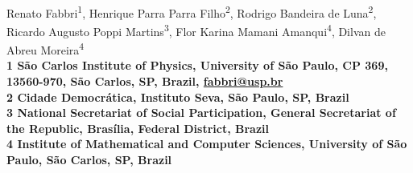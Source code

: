 \documentclass[10pt,letterpaper]{article}
\date{}
\begin{document}
\vspace*{0.35in}

\begin{flushleft}
{\Large
\textbf{}
}
\newline
\\
Renato Fabbri\textsuperscript{1},
Henrique Parra Parra Filho\textsuperscript{2},
Rodrigo Bandeira de Luna\textsuperscript{2},
Ricardo Augusto Poppi Martins\textsuperscript{3},
Flor Karina Mamani Amanqui\textsuperscript{4},
Dilvan de Abreu Moreira\textsuperscript{4}
\\
\bigskip
\bf{1} S\~ao Carlos Institute of Physics, University of S\~ao Paulo, CP 369, 13560-970, S\~ao Carlos, SP, Brazil, \url{fabbri@usp.br}
\\
\bf{2} Cidade Democr\'atica, Instituto Seva, S\~ao Paulo, SP, Brazil
\\
\bf{3} National Secretariat of Social Participation, General Secretariat of the Republic, Bras\'ilia, Federal District, Brazil
\\
\bf{4}  Institute of Mathematical and Computer Sciences, University of São Paulo, S\~ao Carlos, SP, Brazil
\\
\bigskip

% 
%



%
%

\end{flushleft}
\end{document}
